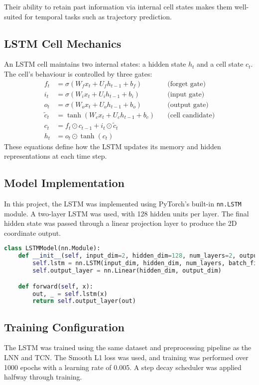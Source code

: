 Their ability to retain past information via internal cell states makes them well-suited for temporal tasks such as trajectory prediction.

\subsection{LSTM Cell Mechanics}
An LSTM cell maintains two internal states: a hidden state $h_t$ and a cell state $c_t$. The cell's behaviour is controlled by three gates:
\[
\begin{aligned}
f_t &= \sigma(W_f x_t + U_f h_{t-1} + b_f) \quad &\text{(forget gate)} \\
i_t &= \sigma(W_i x_t + U_i h_{t-1} + b_i) \quad &\text{(input gate)} \\
o_t &= \sigma(W_o x_t + U_o h_{t-1} + b_o) \quad &\text{(output gate)} \\
\tilde{c}_t &= \tanh(W_c x_t + U_c h_{t-1} + b_c) \quad &\text{(cell candidate)} \\
c_t &= f_t \odot c_{t-1} + i_t \odot \tilde{c}_t \\
h_t &= o_t \odot \tanh(c_t)
\end{aligned}
\]
These equations define how the LSTM updates its memory and hidden representations at each time step.

\subsection{Model Implementation}
In this project, the LSTM was implemented using PyTorch’s built-in \texttt{nn.LSTM} module. A two-layer LSTM was used, with 128 hidden units per layer. The final hidden state was passed through a linear projection layer to produce the 2D coordinate output.

\begin{lstlisting}[language=Python, caption={Simplified LSTM model structure}]
class LSTMModel(nn.Module):
    def __init__(self, input_dim=2, hidden_dim=128, num_layers=2, output_dim=2):
        self.lstm = nn.LSTM(input_dim, hidden_dim, num_layers, batch_first=True)
        self.output_layer = nn.Linear(hidden_dim, output_dim)

    def forward(self, x):
        out, _ = self.lstm(x)
        return self.output_layer(out)
\end{lstlisting}

\subsection{Training Configuration}
The LSTM was trained using the same dataset and preprocessing pipeline as the LNN and TCN. The Smooth L1 loss was used, and training was performed over 1000 epochs with a learning rate of 0.005. A step decay scheduler was applied halfway through training.

